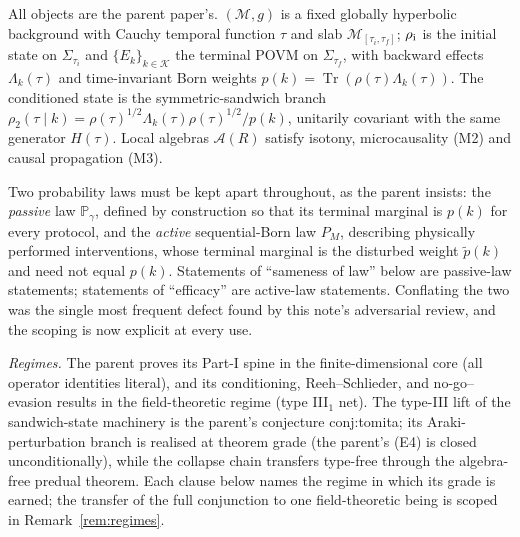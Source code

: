 \documentclass[11pt]{article}
\newcommand{\MM}{\mathcal M}
\newcommand{\AAA}{\mathcal A}
\newcommand{\KK}{\mathcal K}
\newcommand{\Prob}{\mathbb P}
\newcommand{\Tr}{\operatorname{Tr}}
\begin{document}
All objects are the parent paper's. $(\MM,g)$ is a fixed globally hyperbolic
background with Cauchy temporal function $\tau$ and slab $\MM_{[\tau_i,\tau_f]}$;
$\rho_{\rm i}$ is the initial state on $\Sigma_{\tau_i}$ and $\{E_k\}_{k\in\KK}$
the terminal POVM on $\Sigma_{\tau_f}$, with backward effects
$\Lambda_k(\tau)$ and time-invariant Born weights $p(k)=\Tr(\rho(\tau)\Lambda_k(\tau))$.
The conditioned state is the symmetric-sandwich branch
$\rho_2(\tau\mid k)=\rho(\tau)^{1/2}\Lambda_k(\tau)\rho(\tau)^{1/2}/p(k)$, unitarily
covariant with the same generator $H(\tau)$.
Local algebras $\AAA(R)$ satisfy isotony, microcausality (M2) and causal
propagation (M3).

Two probability laws must be kept apart throughout, as the parent insists: the
\emph{passive} law $\Prob_\gamma$, defined by construction so that its terminal
marginal is $p(k)$ for every protocol, and the \emph{active} sequential-Born law
$P_M$, describing physically performed interventions, whose terminal marginal is
the disturbed weight $\widetilde p(k)$ and need not equal $p(k)$.
Statements of ``sameness of law'' below are passive-law statements; statements of
``efficacy'' are active-law statements. Conflating the two was the single most
frequent defect found by this note's adversarial review, and the scoping is now
explicit at every use.

\emph{Regimes.} The parent proves its Part-I spine in the finite-dimensional
core (all operator identities literal), and its conditioning, Reeh--Schlieder,
and no-go--evasion results in the field-theoretic regime (type III$_1$ net).
The type-III lift of the sandwich-state machinery is the parent's conjecture
\textsf{conj:tomita}; its Araki-perturbation branch is realised at theorem grade
(the parent's (E4) is closed unconditionally), while the collapse chain
transfers type-free through the algebra-free predual theorem.
Each clause below names the regime in which its grade is earned; the transfer of
the full conjunction to one field-theoretic being is scoped in
Remark~\ref{rem:regimes}.
\end{document}
